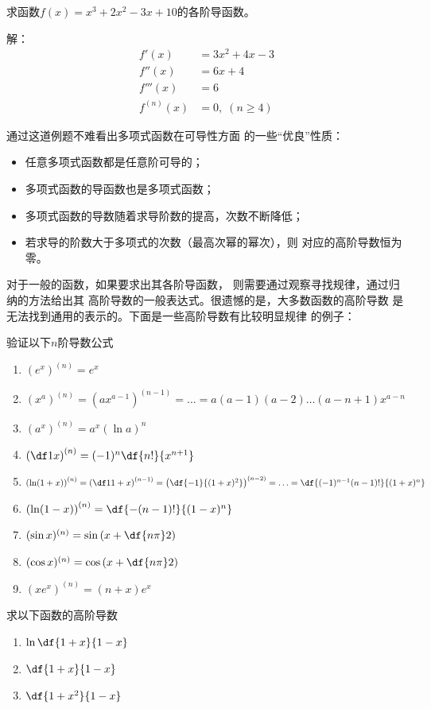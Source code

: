 \egz 求函数$f(x)=x^3+2x^2-3x+10$的各阶导函数。

解：
\begin{align*}
	f'(x)&=3x^2+4x-3\\
	f''(x)&=6x+4\\
	f'''(x)&=6\\
	f^{(n)}(x)&=0,\;(n\geq 4)
\end{align*}
\fin

通过这道例题不难看出多项式函数在可导性方面
的一些“优良”性质：
\begin{itemize}
	\setlength{\itemindent}{1cm}
	\item 任意多项式函数都是任意阶可导的；
	\item 多项式函数的导函数也是多项式函数；
	\item 多项式函数的导数随着求导阶数的提高，次数不断降低；
	\item 若求导的阶数大于多项式的次数（最高次幂的幂次），则
	对应的高阶导数恒为零。
\end{itemize}

\bs
对于一般的函数，如果要求出其各阶导函数，
则需要通过观察寻找规律，通过归纳的方法给出其
高阶导数的一般表达式。很遗憾的是，大多数函数的高阶导数
是无法找到通用的表示的。下面是一些高阶导数有比较明显规律
的例子：

\egz 验证以下$n$阶导数公式
\begin{enumerate}[(1)]
	\setlength{\itemindent}{1cm}
	\item $\left(e^x\right)^{(n)}=e^x$
	\item $\left(x^a\right)^{(n)}=\left(ax^{a-1}\right)^{(n-1)}
	=\ldots=a(a-1)(a-2)\ldots(a-n+1)x^{a-n}$
	\item $\left(a^x\right)^{(n)}=a^x\left(\ln a\right)^n$
	\item $\left(\df1x\right) ^{(n)}=(-1)^n\df{n!}{x^{n+1}}$ 
	\item $\left(\ln(1+x)\right)^{(n)}=\left(\df1{1+x}\right)^{(n-1)}
	=\left(\df{-1}{(1+x)^2}\right)^{(n-2)}=\ldots
	=\df{(-1)^{n-1}(n-1)!}{(1+x)^{n}}$
	\item $\left(\ln(1-x)\right)^{(n)}=\df{-(n-1)!}{(1-x)^{n}}$
	\item $(\sin x)^{(n)}=\sin\left(x+\df{n\pi}2\right)$
	\item $(\cos x)^{(n)}=\cos\left(x+\df{n\pi}2\right)$  
	\item $(xe^x)^{(n)}=(n+x)e^x$
\end{enumerate}

\bs
\egz 求以下函数的高阶导数
\begin{enumerate}[(1)]
	\setlength{\itemindent}{1cm}
	\item $\ln\df{1+x}{1-x}$
	\item $\df{1+x}{1-x}$
	\item $\df{1+x^2}{1-x}$
\end{enumerate}

